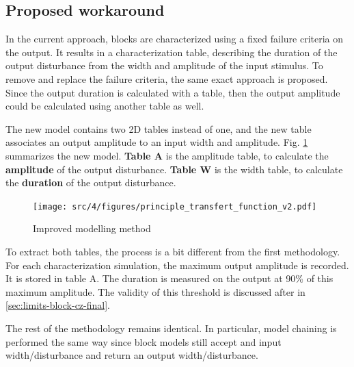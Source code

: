 \subsection{Proposed workaround}

%
In the current approach, blocks are characterized using a fixed failure criteria on the output.
It results in a characterization table, describing the duration of the output disturbance from the width and amplitude of the input stimulus.
To remove and replace the failure criteria, the same exact approach is proposed.
Since the output duration is calculated with a table, then the output amplitude could be calculated using another table as well.

The new model contains two 2D tables instead of one, and the new table associates an output amplitude to an input width and amplitude.
Fig. \ref{fig:principle-transfert-func-v2} summarizes the new model.
\textbf{Table A} is the amplitude table, to calculate the \textbf{amplitude} of the output disturbance.
\textbf{Table W} is the width table, to calculate the \textbf{duration} of the output disturbance.

\begin{figure}[!h]
  \centering
  \texttt{[image: src/4/figures/principle\_transfert\_function\_v2.pdf]}
  \caption{Improved modelling method}
  \label{fig:principle-transfert-func-v2}
\end{figure}

To extract both tables, the process is a bit different from the first methodology.
For each characterization simulation, the maximum output amplitude is recorded.
It is stored in table A.
The duration is measured on the output at 90\% of this maximum amplitude.
The validity of this threshold is discussed after in \ref{sec:limits-block-cz-final}.

The rest of the methodology remains identical.
In particular, model chaining is performed the same way since block models still accept and input width/disturbance and return an output width/disturbance.


